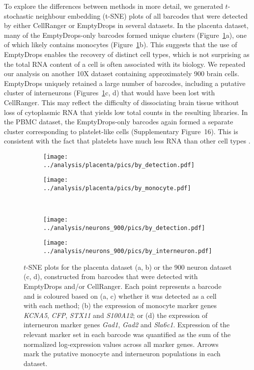 \documentclass[10pt,letterpaper]{article}
\newcommand{\suppfigrealpbmc}{16}
\begin{document}
To explore the differences between methods in more detail, we generated $t$-stochastic neighbour embedding (t-SNE) plots \cite{van2008visualizing} of all barcodes that were detected by either CellRanger or EmptyDrops in several datasets.
In the placenta dataset, many of the EmptyDrops-only barcodes formed unique clusters (Figure~\ref{fig:realtsne}a), one of which likely contains monocytes (Figure~\ref{fig:realtsne}b).
This suggests that the use of EmptyDrops enables the recovery of distinct cell types, which is not surprising as the total RNA content of a cell is often associated with its biology.
We repeated our analysis on another 10X dataset containing approximately 900 brain cells.
EmptyDrops uniquely retained a large number of barcodes, including a putative cluster of interneurons (Figures~\ref{fig:realtsne}c, d) that would have been lost with CellRanger.
This may reflect the difficulty of dissociating brain tissue without loss of cytoplasmic RNA \cite{habib2017massively} that yields low total counts in the resulting libraries.
In the PBMC dataset, the EmptyDrops-only barcodes again formed a separate cluster corresponding to platelet-like cells (Supplementary Figure~\suppfigrealpbmc{}).
This is consistent with the fact that platelets have much less RNA than other cell types \cite{rowley2012platelet}.

\begin{figure}[btp]
    \begin{subfigure}{0.49\textwidth}
        \texttt{[image: ../analysis/placenta/pics/by\_detection.pdf]}
        \caption{}
    \end{subfigure}
    \begin{subfigure}{0.49\textwidth}
        \texttt{[image: ../analysis/placenta/pics/by\_monocyte.pdf]}
        \caption{}
    \end{subfigure} \\[0.05in]
    \begin{subfigure}{0.49\textwidth}
        \texttt{[image: ../analysis/neurons\_900/pics/by\_detection.pdf]}
        \caption{}
    \end{subfigure}
    \begin{subfigure}{0.49\textwidth}
        \texttt{[image: ../analysis/neurons\_900/pics/by\_interneuron.pdf]}
        \caption{}
    \end{subfigure} 
    \caption{$t$-SNE plots for the placenta dataset (a, b) or the 900 neuron dataset (c, d), constructed from barcodes that were detected with EmptyDrops and/or CellRanger.
        Each point represents a barcode and is coloured based on (a, c) whether it was detected as a cell with each method;
        (b) the expression of monocyte marker genes \textit{KCNA5}, \textit{CFP}, \textit{STX11} and \textit{S100A12};
        or (d) the expression of interneuron marker genes \textit{Gad1}, \textit{Gad2} and \textit{Sla6c1}.
        Expression of the relevant marker set in each barcode was quantified as the sum of the normalized log-expression values across all marker genes.
        Arrows mark the putative monocyte and interneuron populations in each dataset.
    }
    \label{fig:realtsne}
\end{figure}
\end{document}
